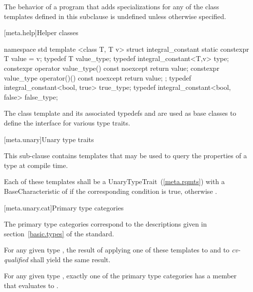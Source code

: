 \pnum
The behavior of a program that adds specializations for any of
the class templates defined in this subclause is undefined unless otherwise specified.

[meta.help]{Helper classes}

\begin{codeblock}
namespace std {
  template <class T, T v>
  struct integral_constant {
    static constexpr T value = v;
    typedef T value_type;
    typedef integral_constant<T,v> type;
    constexpr operator value_type() const noexcept { return value; }
    constexpr value_type operator()() const noexcept { return value; }
  };
  typedef integral_constant<bool, true> true_type;
  typedef integral_constant<bool, false> false_type;
}
\end{codeblock}

\pnum
The class template  and its associated typedefs
 and  are used as base classes to define
the interface for various type traits.

[meta.unary]{Unary type traits}

\pnum
This sub-clause contains templates that may be used to query the
properties of a type at compile time.

\pnum
Each of these templates shall be a
UnaryTypeTrait~(\ref{meta.rqmts})
with a BaseCharacteristic of
 if the corresponding condition is true, otherwise
.

[meta.unary.cat]{Primary type categories}

\pnum
The primary type categories correspond to the descriptions given in
section~\ref{basic.types} of the \Cpp standard.

\pnum
For any given type , the result of applying one of these templates to
 and to \textit{cv-qualified}  shall yield the same result.

\pnum
\enternote
For any given type , exactly one of the primary type categories
has a  member that evaluates to .
\exitnote

